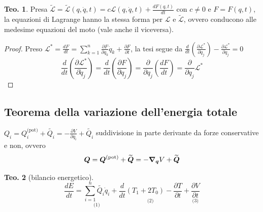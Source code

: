 \documentclass[a4paper,10pt]{article}
\theoremstyle{definition}
\newcommand{\bv}{\boldsymbol} %
\theoremstyle{indentdefinition}
\theoremstyle{indenttheorem}
\newtheorem{thm}{Teo.}
\theoremstyle{myremark}
\theoremstyle{indentgeneral}
\newenvironment{myboxed} 
{\noindent\begin{lrbox}{\mybox}\begin{minipage}{\textwidth}}
{\end{minipage}\end{lrbox}\fbox{\usebox{\mybox}}}
\begin{document}
\begin{myboxed}
\begin{thm}
Presa $\widetilde{\mathcal{L}}=\widetilde{\mathcal{L}}\left(q,\dot{q},t\right)=c\mathcal{L}\left(q,\dot{q},t\right)+\frac{dF\left(q,t\right)}{dt}$
con $c\neq0$ e $F=F\left(q,t\right)$, la equazioni di Lagrange hanno
la stessa forma per $\mathcal{L}$ e $\widetilde{\mathcal{L}}$, ovvero conducono alle medesime equazioni del moto (vale anche il viceversa).
\end{thm}
\end{myboxed}

\begin{proof}
Preso $\mathcal{L}^{*}=\frac{dF}{dt}=\sum_{k=1}^{n}\boxed{\frac{\partial F}{\partial q_{k}}}\dot{q}_{k}+\frac{\partial F}{\partial t}$,
la tesi segue da $\frac{d}{dt}\left(\frac{\partial\mathcal{L}^{*}}{\partial\dot{q}_{j}}\right)-\frac{\partial\mathcal{L}^{*}}{\partial q_{j}}=0$
\[
\frac{d}{dt}\left(\frac{\partial\mathcal{L}^{*}}{\partial\dot{q}_{j}}\right)=\frac{d}{dt}\left(\frac{\partial F}{\partial q_{j}}\right)=\frac{\partial}{\partial q_{j}}\left(\frac{dF}{dt}\right)=\frac{\partial}{\partial q_{j}}\mathcal{L}^{*}
\]
\end{proof}




\subsection{Teorema della variazione dell'energia totale}

$Q_{i}=Q_{i}^{\text{(pot)}}+\widetilde{Q_{i}}=-\frac{\partial V}{\partial q_{i}}+\widetilde{Q_{i}}$
suddivisione in parte derivante da forze conservative e non, ovvero
$$\bv{Q}=\bv{Q}^{\text{(pot)}}+\widetilde{\bv{Q}}=-\grad_{\bv{q}}V+\widetilde{\bv{Q}}$$
\begin{thm}[bilancio energetico]
\[
\frac{dE}{dt}=\underset{\text{(1)}}{\boxed{\sum_{i=1}^{n}\widetilde{Q_{i}}\dot{q}_{i}}}+\underset{\text{(2)}}{\boxed{\frac{d}{dt}\left(T_{1}+2T_{0}\right)-\frac{\partial T}{\partial t}}}+\underset{\text{(3)}}{\boxed{\frac{\partial V}{\partial t}}}
\]
\end{thm}
\end{document}
